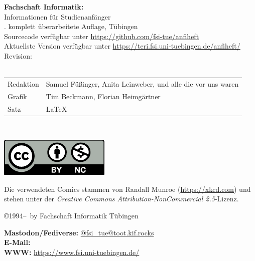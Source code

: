 \thispagestyle{empty}

\textbf{Fachschaft Informatik:}\\
Informationen für Studienanfänger\\
\number\auflage. komplett überarbeitete Auf\/lage, Tübingen \number\jahr\\[0.2cm]
{\footnotesize Sourcecode verfügbar unter \url{https://github.com/fsi-tue/anfiheft}\\
               Aktuellste Version verfügbar unter \url{https://teri.fsi.uni-tuebingen.de/anfiheft/}\\
               Revision: \gitCommit\\[1cm]}
\medskip \\

\begin{tabular}{ll}
	Redaktion & Samuel Füßinger, Anita Leinweber, und alle die vor uns waren \\ %
	Grafik & Tim Beckmann, Florian Heimgärtner \\
	Satz & \LaTeX
\end{tabular}\\

\vfill
\begin{minipage}[c]{0.1\textwidth}
	\includegraphics[width=\linewidth]{shared/logos/by-nc.pdf}
\end{minipage}
\begin{minipage}[c]{0.9\textwidth}
	Die verwendeten Comics stammen von Randall Munroe (\url{https://xkcd.com}) und stehen unter der \emph{Creative Commons Attribution-NonCommercial 2.5}-Lizenz.
\end{minipage}

\copyright 1994--\number\jahr ~by Fachschaft Informatik Tübingen\\

\medskip

\textbf{Mastodon/Fediverse:} \hfill
\href{https://toot.kif.rocks/@fsi\_tue}{\faMastodon @fsi\_tue@toot.kif.rocks}\\
\textbf{E-Mail:} \hfill
{}\\
\textbf{WWW:} \hfill
\url{https://www.fsi.uni-tuebingen.de/}
\newpage
